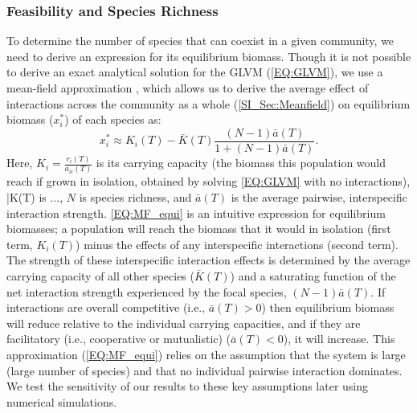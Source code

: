 \documentclass{article}
\begin{document}
\subsubsection*{Feasibility and Species Richness} \label{SEC:Feas_SP_rich}

To determine the number of species that can coexist in a given community, we need to derive an expression for its equilibrium biomass. Though it is not possible to derive an exact analytical solution for the GLVM (\cref{EQ:GLVM}), we use a mean-field approximation \citep{Wilson2003,Wilson2004}, which allows us to derive the average effect of interactions across the community as a whole (\cref{SI_Sec:Meanfield}) on equilibrium biomass ($x^*_i$) of each species as: 
\begin{equation}\label{EQ:MF_equi}
  x^*_i \approx K_i(T) -  \bar{K}(T)  \frac{ (N-1)\bar{a}(T)}{1 + (N-1)\bar{a}(T)}. 
\end{equation}
Here, $K_i = \frac{r_i(T)}{a_{ii}(T)}$ is its carrying capacity (the biomass this population would reach if grown in isolation, obtained by solving \cref{EQ:GLVM} with no interactions), \bar{K}(T) is ..., $N$ is species richness, and $\bar{a}(T)$ is the average pairwise, interspecific interaction strength. \cref{EQ:MF_equi} is an intuitive expression for equilibrium biomasses; a population will reach the biomass that it would in isolation (first term, $K_i(T)$) minus the effects of any interspecific interactions (second term). The strength of these interspecific interaction effects is determined by the average carrying capacity of all other species ($\bar{K}(T)$) and a saturating function of the net interaction strength experienced by the focal species, $(N-1)\bar{a}(T)$. If interactions are overall competitive (i.e., $\bar{a}(T) > 0$) then equilibrium biomass will reduce relative to the individual carrying capacities, and if they are facilitatory (i.e., cooperative or mutualistic) ($ \bar{a}(T) < 0$), it will increase. This approximation (\cref{EQ:MF_equi}) relies on the assumption that the system is large (large number of species) and that no individual pairwise interaction dominates. We test the sensitivity of our results to these key assumptions later using numerical simulations.
\end{document}
